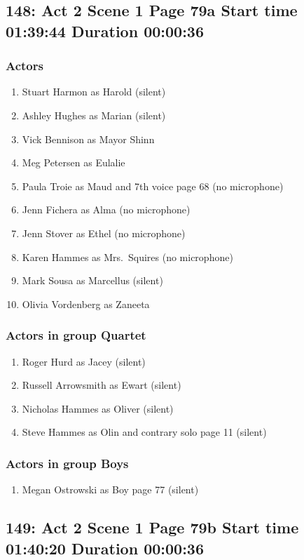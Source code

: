 \subsection{148: Act 2 Scene 1 Page 79a Start time 01:39:44 Duration 00:00:36}

\subsubsection{Actors}
\begin{enumerate}
\item Stuart Harmon as Harold (silent)
\item Ashley Hughes as Marian (silent)
\item Vick Bennison as Mayor Shinn
\item Meg Petersen as Eulalie
\item Paula Troie as Maud and 7th voice page 68 (no microphone)
\item Jenn Fichera as Alma (no microphone)
\item Jenn Stover as Ethel (no microphone)
\item Karen Hammes as Mrs.~Squires (no microphone)
\item Mark Sousa as Marcellus (silent)
\item Olivia Vordenberg as Zaneeta
\end{enumerate}
\subsubsection{Actors in group Quartet}
\begin{enumerate}
\item Roger Hurd as Jacey (silent)
\item Russell Arrowsmith as Ewart (silent)
\item Nicholas Hammes as Oliver (silent)
\item Steve Hammes as Olin and contrary solo page 11 (silent)
\end{enumerate}
\subsubsection{Actors in group Boys}
\begin{enumerate}
\item Megan Ostrowski as Boy page 77 (silent)
\end{enumerate}


\subsection{149: Act 2 Scene 1 Page 79b Start time 01:40:20 Duration 00:00:36}

